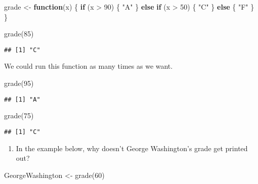 \documentclass[
]{article}
\newenvironment{Shaded}{\begin{snugshade}}{\end{snugshade}}
\newcommand{\ControlFlowTok}[1]{\textcolor[rgb]{0.13,0.29,0.53}{\textbf{#1}}}
\newcommand{\DecValTok}[1]{\textcolor[rgb]{0.00,0.00,0.81}{#1}}
\newcommand{\FunctionTok}[1]{\textcolor[rgb]{0.00,0.00,0.00}{#1}}
\newcommand{\NormalTok}[1]{#1}
\newcommand{\OtherTok}[1]{\textcolor[rgb]{0.56,0.35,0.01}{#1}}
\newcommand{\SpecialCharTok}[1]{\textcolor[rgb]{0.00,0.00,0.00}{#1}}
\newcommand{\StringTok}[1]{\textcolor[rgb]{0.31,0.60,0.02}{#1}}
\providecommand{\tightlist}{%
  \setlength{\itemsep}{0pt}\setlength{\parskip}{0pt}}
\begin{document}
\begin{Shaded}
\begin{Highlighting}[]
\NormalTok{grade }\OtherTok{\textless{}{-}} \ControlFlowTok{function}\NormalTok{(x) \{}
  \ControlFlowTok{if}\NormalTok{ (x }\SpecialCharTok{\textgreater{}} \DecValTok{90}\NormalTok{) \{}
  \StringTok{"A"}
\NormalTok{\} }\ControlFlowTok{else} \ControlFlowTok{if}\NormalTok{ (x }\SpecialCharTok{\textgreater{}} \DecValTok{50}\NormalTok{) \{}
  \StringTok{"C"}
\NormalTok{\} }\ControlFlowTok{else}\NormalTok{ \{}
  \StringTok{"F"}
\NormalTok{  \}}
\NormalTok{\}}


\FunctionTok{grade}\NormalTok{(}\DecValTok{85}\NormalTok{)}
\end{Highlighting}
\end{Shaded}

\begin{verbatim}
## [1] "C"
\end{verbatim}

We could run this function as many times as we want.

\begin{Shaded}
\begin{Highlighting}[]
\FunctionTok{grade}\NormalTok{(}\DecValTok{95}\NormalTok{)}
\end{Highlighting}
\end{Shaded}

\begin{verbatim}
## [1] "A"
\end{verbatim}

\begin{Shaded}
\begin{Highlighting}[]
\FunctionTok{grade}\NormalTok{(}\DecValTok{75}\NormalTok{)}
\end{Highlighting}
\end{Shaded}

\begin{verbatim}
## [1] "C"
\end{verbatim}

\begin{enumerate}
\def\labelenumi{(\arabic{enumi})}
\setcounter{enumi}{22}
\tightlist
\item
  In the example below, why doesn't George Washington's grade get
  printed out?
\end{enumerate}

\begin{Shaded}
\begin{Highlighting}[]
\NormalTok{GeorgeWashington }\OtherTok{\textless{}{-}} \FunctionTok{grade}\NormalTok{(}\DecValTok{60}\NormalTok{)}
\end{Highlighting}
\end{Shaded}
\end{document}
